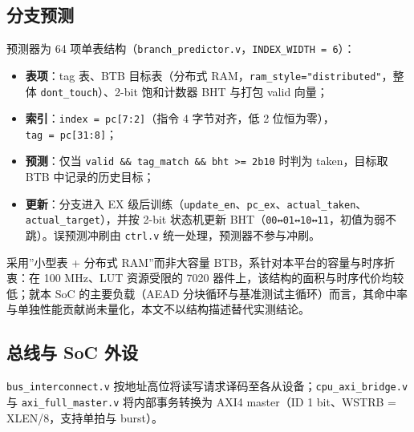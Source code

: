 \Needspace{85pt}

\subsection{分支预测}

预测器为 64 项单表结构（\texttt{branch\_\allowbreak{}predictor.\allowbreak{}v}，\texttt{INDEX\_\allowbreak{}WIDTH\ =\ 6}）：

\begin{itemize}
\tightlist
\item
  \textbf{表项}：tag 表、BTB 目标表（分布式 RAM，\texttt{ram\_\allowbreak{}style="distributed"}，整体 \texttt{dont\_\allowbreak{}touch}）、2-bit 饱和计数器 BHT 与打包 valid 向量；
\item
  \textbf{索引}：\texttt{index\ =\ pc{[}7:2{]}}（指令 4 字节对齐，低 2 位恒为零），\texttt{tag\ =\ pc{[}31:8{]}}；
\item
  \textbf{预测}：仅当 \texttt{valid\ \&\&\ tag\_match\ \&\&\ bht\ \textgreater{}=\ 2\textquotesingle{}b10} 时判为 taken，目标取 BTB 中记录的历史目标；
\item
  \textbf{更新}：分支进入 EX 级后训练（\texttt{update\_\allowbreak{}en}、\texttt{pc\_\allowbreak{}ex}、\texttt{actual\_\allowbreak{}taken}、\texttt{actual\_\allowbreak{}target}），并按 2-bit 状态机更新 BHT（\texttt{00↔01↔10↔11}，初值为弱不跳）。误预测冲刷由 \texttt{ctrl.\allowbreak{}v} 统一处理，预测器不参与冲刷。
\end{itemize}

采用''小型表 + 分布式 RAM''而非大容量 BTB，系针对本平台的容量与时序折衷：在 100 MHz、LUT 资源受限的 7020 器件上，该结构的面积与时序代价均较低；就本 SoC 的主要负载（AEAD 分块循环与基准测试主循环）而言，其命中率与单独性能贡献尚未量化，本文不以结构描述替代实测结论。

\Needspace{85pt}

\subsection{总线与 SoC 外设}\label{ux603bux7ebfux4e0e-soc-ux5916ux8bbe}

\texttt{bus\_\allowbreak{}interconnect.\allowbreak{}v} 按地址高位将读写请求译码至各从设备；\texttt{cpu\_\allowbreak{}axi\_\allowbreak{}bridge.\allowbreak{}v} 与 \texttt{axi\_\allowbreak{}full\_\allowbreak{}master.\allowbreak{}v} 将内部事务转换为 AXI4 master（ID 1 bit、WSTRB = XLEN/8，支持单拍与 burst）。

